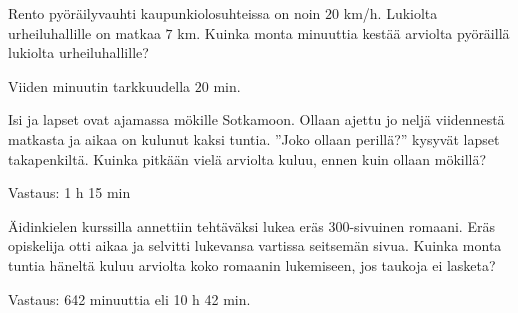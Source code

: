 \begin{tehtava}
Rento pyöräilyvauhti kaupunkiolosuhteissa on noin $20$ km/h. Lukiolta urheiluhallille on matkaa $7$ km. Kuinka monta minuuttia kestää arviolta pyöräillä lukiolta urheiluhallille?
\begin{vastaus}
Viiden minuutin tarkkuudella $20$ min.
\end{vastaus}
\end{tehtava}

\begin{tehtava}
    Isi ja lapset ovat ajamassa mökille Sotkamoon. Ollaan ajettu jo neljä
    viidennestä matkasta ja aikaa on kulunut kaksi tuntia. ''Joko ollaan perillä?''
    kysyvät lapset takapenkiltä. Kuinka pitkään vielä arviolta kuluu, ennen
    kuin ollaan mökillä?
    
    \begin{vastaus}
        Vastaus: 1 h 15 min
    \end{vastaus}
\end{tehtava}

\begin{tehtava}
    Äidinkielen kurssilla annettiin tehtäväksi lukea eräs 300-sivuinen romaani.
    Eräs opiskelija otti aikaa ja selvitti lukevansa vartissa seitsemän sivua.
    Kuinka monta tuntia häneltä kuluu arviolta koko romaanin lukemiseen, jos
    taukoja ei lasketa?
    
    \begin{vastaus}
        Vastaus: 642 minuuttia eli 10 h 42 min.
    \end{vastaus}
\end{tehtava}
